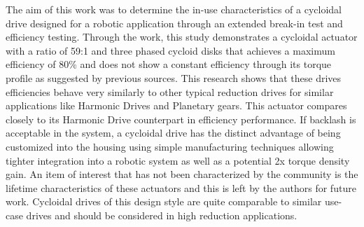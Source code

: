 The aim of this work was to determine the in-use characteristics of a cycloidal drive designed for a robotic application through an extended break-in test and efficiency testing. Through the work, this study demonstrates a cycloidal actuator with a ratio of 59:1 and three phased cycloid disks that achieves a maximum efficiency of 80\% and does not show a constant efficiency through its torque profile as suggested by previous sources.
This research shows that these drives efficiencies behave very similarly to other typical reduction drives for similar applications like Harmonic Drives and Planetary gears.
This actuator compares closely to its Harmonic Drive counterpart in efficiency performance.
If backlash is acceptable in the system, a cycloidal drive has the distinct advantage of being customized into the housing using simple manufacturing techniques allowing tighter integration into a robotic system as well as a potential 2x torque density gain.
An item of interest that has not been characterized by the community is the lifetime characteristics of these actuators and this is left by the authors for future work.
Cycloidal drives of this design style are quite comparable to similar use-case drives and should be considered in high reduction applications.
